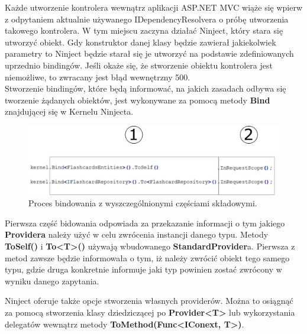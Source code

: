 Każde utworzenie kontrolera wewnątrz aplikacji ASP.NET MVC wiąże się wpierw z odpytaniem aktualnie używanego IDependencyResolvera o próbę utworzenia takowego kontrolera. W tym miejscu zaczyna działać Ninject, który stara się utworzyć obiekt. Gdy konstruktor danej klasy będzie zawierał jakiekolwiek parametry to Ninject będzie starał się je utworzyć na podstawie zdefiniowanych uprzednio bindingów. Jeśli okaże się, że stworzenie obiektu kontrolera jest niemożliwe, to zwracany jest błąd wewnętrzny 500.
\\
Stworzenie bindingów, które będą informować, na jakich zasadach odbywa się tworzenie żądanych obiektów, jest wykonywane za pomocą metody \textbf{Bind} znajdującej się w Kernelu Ninjecta.


\begin{figure}[h]
	\centering
	\includegraphics[width=\textwidth]{images/ninject.png}
	 \caption{Proces bindowania z wyszczególnionymi częściami składowymi.}
\end{figure}

Pierwsza część bidowania odpowiada za przekazanie informacji o tym jakiego \textbf{Providera} należy użyć w celu zwrócenia instancji danego typu.
Metody \textbf{ToSelf()} i \textbf{To<T>()} używają wbudowanego \textbf{StandardProvider}a. Pierwsza z metod zawsze będzie informowała o tym, iż należy zwrócić obiekt tego samego typu, gdzie druga konkretnie informuje jaki typ powinien zostać zwrócony w wyniku danego zapytania.

Ninject oferuje także opcje stworzenia własnych providerów. Można to osiągnąć za pomocą stworzenia klasy dziedziczącej po \textbf{Provider<T>} lub wykorzystania delegatów wewnątrz metody \textbf{ToMethod(Func<IConext, T>)}.

